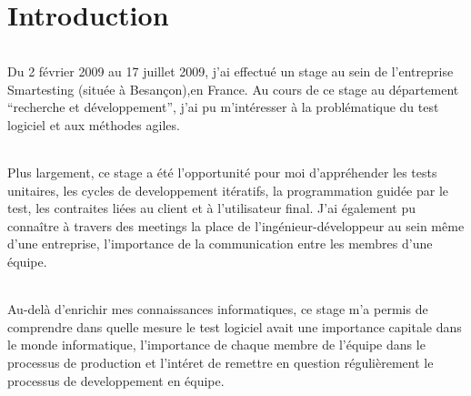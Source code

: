 \chapter*{Introduction}
\subparagraph*{}
Du 2 février 2009 au 17 juillet 2009, j’ai effectué un stage au sein de l’entreprise Smartesting (située à Besançon),en France. Au cours de ce stage au département ``recherche et développement'', j’ai pu m’intéresser à la problématique du test logiciel et aux méthodes agiles.
\subparagraph*{}
Plus largement, ce stage a été l’opportunité pour moi d’appréhender les tests unitaires, les cycles de developpement itératifs, la programmation guidée par le test, les contraites liées au client et à l'utilisateur final. J'ai également pu connaître à travers des meetings la place de l'ingénieur-développeur au sein même d'une entreprise, l'importance de la communication entre les membres d'une équipe.
\subparagraph*{}
Au-delà d’enrichir mes connaissances informatiques, ce stage m’a permis de comprendre dans quelle mesure le test logiciel avait une importance capitale dans le monde informatique, l'importance de chaque membre de l'équipe dans le processus de production et l'intéret de remettre en question régulièrement le processus de developpement en équipe.
